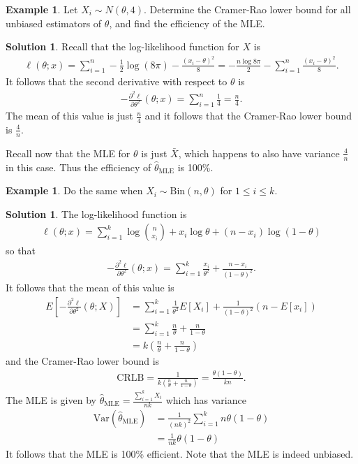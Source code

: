 \documentclass[11pt]{amsart}
\theoremstyle{definition}
\newtheorem{example}[theorem]{Example}
\newtheorem{solution}[theorem]{Solution}
\numberwithin{equation}{section}
\begin{document}
\begin{example}
    Let $X_i\sim N(\theta,4)$. Determine the Cramer-Rao lower bound for all unbiased estimators of $\theta$, and find the efficiency of the MLE.
\end{example}
\addtocounter{theorem}{-1}
\begin{solution}
    Recall that the log-likelihood function for $X$ is
    \begin{align*}
        \ell(\theta;x)=\sum_{i=1}^n-\frac{1}{2}\log(8\pi)-\frac{(x_i-\theta)^2}{8}=-\frac{n\log 8\pi}{2}-\sum_{i=1}^n\frac{(x_i-\theta)^2}{8}.
    \end{align*}
    It follows that the second derivative with respect to $\theta$ is
    \begin{align*}
        -\frac{\partial^2\ell}{\partial\theta^2}(\theta;x)=\sum_{i=1}^n\frac{1}{4}=\frac{n}{4}.
    \end{align*}
    The mean of this value is just $\frac{n}{4}$ and it follows that the Cramer-Rao lower bound is $\frac{4}{n}$.

    Recall now that the MLE for $\theta$ is just $\bar X$, which happens to also have variance $\frac{4}{n}$ in this case. Thus the efficiency of $\hat\theta_{\mathrm{MLE}}$ is 100\%.
\end{solution}
\begin{example}
    Do the same when $X_i\sim\mathrm{Bin}(n,\theta)$ for $1\le i\le k$.
\end{example}
\addtocounter{theorem}{-1}
\begin{solution}
    The log-likelihood function is
    \begin{align*}
        \ell(\theta;x)=\sum_{i=1}^k\log\binom{n}{x_i}+x_i\log\theta+(n-x_i)\log(1-\theta)
    \end{align*}
    so that
    \begin{align*}
        -\frac{\partial^2\ell}{\partial\theta^2}(\theta;x)=\sum_{i=1}^k\frac{x_i}{\theta^2}+\frac{n-x_i}{(1-\theta)^2}.
    \end{align*}
    It follows that the mean of this value is
    \begin{align*}
        E[-\frac{\partial^2\ell}{\partial\theta^2}(\theta;X)]&=\sum_{i=1}^k\frac{1}{\theta^2}E[X_i]+\frac{1}{(1-\theta)^2}(n-E[x_i])\\
        &=\sum_{i=1}^k\frac{n}{\theta}+\frac{n}{1-\theta}\\
        &=k\left(\frac{n}{\theta}+\frac{n}{1-\theta}\right)
    \end{align*}
    and the Cramer-Rao lower bound is
    \begin{align*}
        \mathrm{CRLB}=\frac{1}{k\left(\frac{n}{\theta}+\frac{n}{1-\theta}\right)}=\frac{\theta(1-\theta)}{kn}.
    \end{align*}
    The MLE is given by $\hat\theta_{\mathrm{MLE}}=\frac{\sum_{i=1}^kX_i}{nk}$ which has variance
    \begin{align*}
        \mathrm{Var}(\hat\theta_{\mathrm{MLE}})&=\frac{1}{(nk)^2}\sum_{i=1}^kn\theta(1-\theta)\\
        &=\frac{1}{nk}\theta(1-\theta)
    \end{align*}
    It follows that the MLE is 100\% efficient. Note that the MLE is indeed unbiased.
\end{solution}
\end{document}

